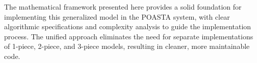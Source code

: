 \documentclass[11pt]{article}
\begin{document}
The mathematical framework presented here provides a solid foundation for implementing this generalized model in the POASTA system, with clear algorithmic specifications and complexity analysis to guide the implementation process. The unified approach eliminates the need for separate implementations of 1-piece, 2-piece, and 3-piece models, resulting in cleaner, more maintainable code.
\end{document}
